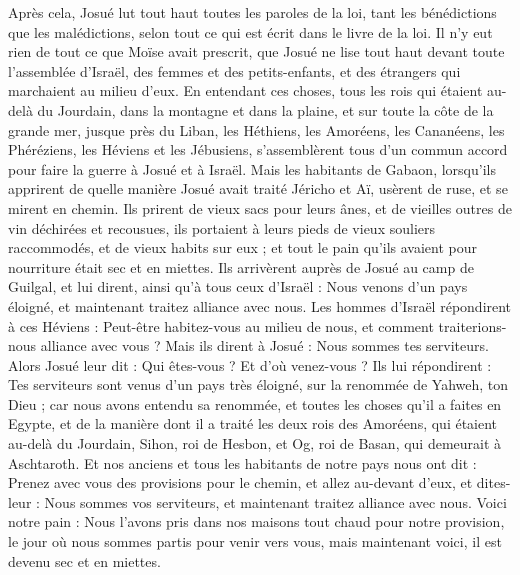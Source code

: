 \begin{multicols}{2}
Après cela, Josué lut tout haut toutes les paroles de la loi, tant les bénédictions que les malédictions, selon tout ce qui est écrit dans le livre de la loi.
Il n’y eut rien de tout ce que Moïse avait prescrit, que Josué ne lise tout haut devant toute l’assemblée d’Israël, des femmes et des petits-enfants, et des étrangers qui marchaient au milieu d’eux.
\VerseOne{}En entendant ces choses, tous les rois qui étaient au-delà du Jourdain, dans la montagne et dans la plaine, et sur toute la côte de la grande mer, jusque près du Liban, les Héthiens, les Amoréens, les Cananéens, les Phéréziens, les Héviens et les Jébusiens,
s’assemblèrent tous d’un commun accord pour faire la guerre à Josué et à Israël.
Mais les habitants de Gabaon, lorsqu’ils apprirent de quelle manière Josué avait traité Jéricho et Aï,
usèrent de ruse, et se mirent en chemin. Ils prirent de vieux sacs pour leurs ânes, et de vieilles outres de vin déchirées et recousues,
ils portaient à leurs pieds de vieux souliers raccommodés, et de vieux habits sur eux ; et tout le pain qu’ils avaient pour nourriture était sec et en miettes.
Ils arrivèrent auprès de Josué au camp de Guilgal, et lui dirent, ainsi qu’à tous ceux d’Israël : Nous venons d’un pays éloigné, et maintenant traitez alliance avec nous.
Les hommes d’Israël répondirent à ces Héviens : Peut-être habitez-vous au milieu de nous, et comment traiterions-nous alliance avec vous ?
Mais ils dirent à Josué : Nous sommes tes serviteurs. Alors Josué leur dit : Qui êtes-vous ? Et d’où venez-vous ?
Ils lui répondirent : Tes serviteurs sont venus d’un pays très éloigné, sur la renommée de Yahweh, ton Dieu ; car nous avons entendu sa renommée, et toutes les choses qu’il a faites en Egypte,
et de la manière dont il a traité les deux rois des Amoréens, qui étaient au-delà du Jourdain, Sihon, roi de Hesbon, et Og, roi de Basan, qui demeurait à Aschtaroth.
Et nos anciens et tous les habitants de notre pays nous ont dit : Prenez avec vous des provisions pour le chemin, et allez au-devant d’eux, et dites-leur : Nous sommes vos serviteurs, et maintenant traitez alliance avec nous.
Voici notre pain : Nous l’avons pris dans nos maisons tout chaud pour notre provision, le jour où nous sommes partis pour venir vers vous, mais maintenant voici, il est devenu sec et en miettes.

\end{multicols}
